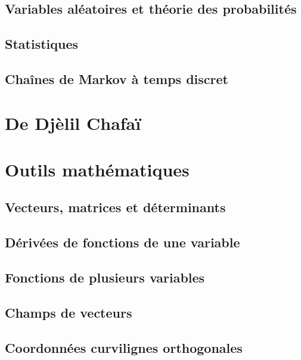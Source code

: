 \chapter{Variables aléatoires et théorie des probabilités}



\chapter{Statistiques}


\chapter{Chaînes de Markov à temps discret}


\part{De Djèlil Chafaï}




\part{Outils mathématiques}

\chapter{Vecteurs, matrices et déterminants}

\chapter{Dérivées de fonctions de une variable}


\chapter{Fonctions de plusieurs variables}


\chapter{Champs de vecteurs}


\chapter{Coordonnées curvilignes orthogonales}



